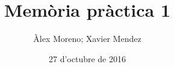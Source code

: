 \documentclass[catalan,parskip=half*,oneside,hidelinks]{scrreprt}
\begin{document}
\title{Memòria pràctica 1}
\date{27 d'octubre de 2016}
\author{Àlex Moreno; Xavier Mendez}

\maketitle

\tableofcontents
\clearpage


\newcommand{\inputproject}[1]{
  \renewcommand{\projectname}{#1}
  
}
\inputproject{1A}
\inputproject{1B}
\inputproject{1A-extra1}
\inputproject{1B-extra1}
\inputproject{1B-extra2}
\end{document}
